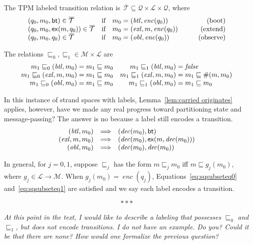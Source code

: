 \documentclass[12pt]{article}
\newenvironment{note}{\begingroup\itshape}{\endgroup}
\newcommand{\cn}[1]{\ensuremath{\operatorname{\mathsf{#1}}}}
\newcommand{\fn}[1]{\ensuremath{\operatorname{\mathit{#1}}}}
\newcommand{\gtag}[1]{\ensuremath{\mathit{#1}}}
\newcommand{\msg}{\ensuremath{\mathcal{M}}}
\newcommand{\sta}{\ensuremath{\mathcal{Q}}}
\newcommand{\boot}{\cn{bt}}
\newcommand{\extend}{\cn{ex}}
\newcommand{\tran}{\ensuremath{\mathcal{T}}}
\newcommand{\encode}{\fn{enc}}
\newcommand{\decode}{\fn{dec}}
\newcommand{\lab}{\ensuremath{\mathcal{L}}}
\newcommand{\cbar}[1]{\ensuremath{\overline{#1}}}
\begin{document}
The TPM labeled transition relation
is~$\cbar\tran\subseteq\sta\times\lab\times\sta$, where
\[\begin{array}{llr@{{}={}}lr}
  (q_0, m_0, \boot)\in\cbar\tran
&\text{if}&m_0&(\gtag{btl}, \encode(q_0)) & \mbox{(boot)} \\
(q_0, m_0, \cn{ex}(m,q_0))\in\cbar\tran
&\text{if}&m_0& (\gtag{exl}, m, \encode(q_0))&
\mbox{(extend)} \\
(q_0, m_0, q_0)\in\cbar\tran&\text{if}& m_0 &(\gtag{obl},\encode(q_0))&\qquad
\mbox{(observe)}
\end{array}\]

The relations ${\sqsubseteq_0,\sqsubseteq_1}\in\msg\times\lab$ are
\[\begin{array}{r@{{}={}}l@{\quad}r@{{}={}}l}
m_1 \sqsubseteq_0(\gtag{btl},m_0)&
m_1 \sqsubseteq m_0
& m_1 \sqsubseteq_1(\gtag{btl},m_0)&
\fn{false}\\
m_1 \sqsubseteq_0(\gtag{exl},m,m_0)&
m_1 \sqsubseteq m_0
& m_1 \sqsubseteq_1(\gtag{exl},m,m_0)&
m_1 \sqsubseteq \#(m,m_0)\\
m_1 \sqsubseteq_0(\gtag{obl},m_0)&
m_1 \sqsubseteq m_0
& m_1 \sqsubseteq_1(\gtag{obl},m_0)&
m_1 \sqsubseteq m_0
\end{array}\]

In this instance of strand spaces with labels, Lemma~\ref{lem:carried
  originates} applies, however, have we made any real progress toward
partitioning state and message-passing?  The answer is no because a
label still encodes a transition.
%
\[\begin{array}{r@{\quad\Longrightarrow\quad}l}
(\gtag{btl},m_0)&(\decode(m_0),\boot)\\
(\gtag{exl},m,m_0)&(\decode(m_0),\extend(m,\decode(m_0)))\\
(\gtag{obl},m_0)&(\decode(m_0),\decode(m_0))
\end{array}\]

In general, for $j=0,1$, suppose $\sqsubseteq_j$ has the form
$m\sqsubseteq_j m_0$ iff $m\sqsubseteq g_j(m_0)$, where
$g_j\in\lab\to\msg$.  When $g_j(m_0)=\encode(q_j)$,
Equations~\ref{eq:sqsubseteq0} and~\ref{eq:sqsubseteq1} are satisfied
and we say each label encodes a transition.

\[\ast\ast\ast\]

\begin{note}
  At this point in the text, I would like to describe a labeling that
  possesses $\sqsubseteq_0$ and $\sqsubseteq_1$, but does not encode
  transitions.  I do not have an example.  Do you?  Could it be that
  there are none?  How would one formalize the previous question?
\end{note}
\end{document}
